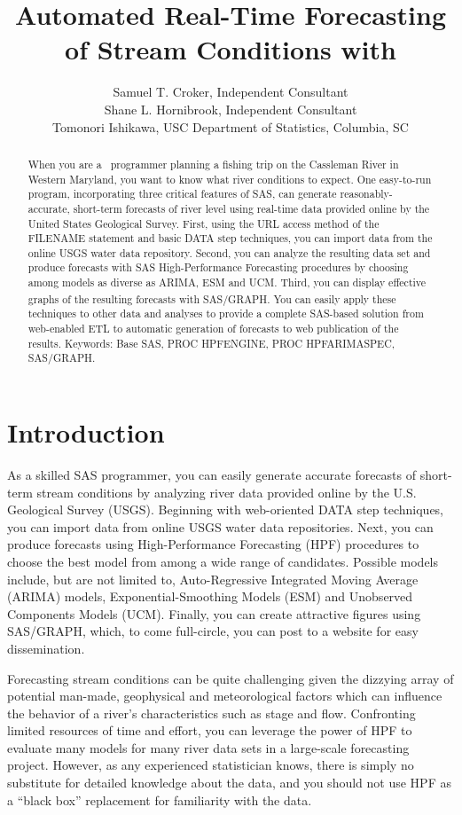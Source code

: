 \documentclass[10pt]{sugconf-ish}
\title{Automated Real-Time Forecasting of Stream Conditions with \SASregistered}
\author{Samuel T. Croker,  Independent Consultant\\
Shane L. Hornibrook,  Independent Consultant \\
Tomonori Ishikawa, USC Department of Statistics, Columbia, SC}
\begin{document}
\begin{abstract}
When you are a \SASregistered\ programmer planning a fishing trip on the Cassleman River in Western Maryland, you want to know what river conditions to expect. One easy-to-run program, incorporating three critical features of SAS, can generate reasonably-accurate, short-term forecasts of river level using real-time data provided online by the United States Geological Survey. First, using the URL access method of the FILENAME statement and basic DATA step techniques, you can import data from the online USGS water data repository. Second, you can analyze the resulting data set and produce forecasts with SAS High-Performance Forecasting procedures by choosing among models as diverse as ARIMA, ESM and UCM. Third, you can display effective graphs of the resulting forecasts with SAS/GRAPH\textsuperscript{\scriptsize\textregistered}. You can easily apply these techniques to other data and analyses to provide a complete SAS-based solution from web-enabled ETL to automatic generation of forecasts to web publication of the results. Keywords: Base SAS, PROC HPFENGINE, PROC HPFARIMASPEC, SAS/GRAPH.
\end{abstract}


\section{Introduction}

As a skilled SAS programmer, you can easily generate accurate forecasts of short-term stream conditions by analyzing river data provided online by the U.S. Geological Survey (USGS). Beginning with web-oriented DATA step techniques, you can import data from online USGS water data repositories. Next, you can produce forecasts using High-Performance Forecasting (HPF) procedures to choose the best model from among a wide range of candidates. Possible models include, but are not limited to, Auto-Regressive Integrated Moving Average (ARIMA) models, Exponential-Smoothing Models (ESM) and Unobserved Components Models (UCM). Finally, you can create attractive figures using SAS/GRAPH, which, to come full-circle, you can post to a website for easy dissemination.

Forecasting stream conditions can be quite challenging given the dizzying array of potential man-made, geophysical and meteorological factors which can influence the behavior of a river's characteristics such as stage and flow. Confronting limited resources of time and effort, you can leverage the power of HPF to evaluate many models for many river data sets in a large-scale forecasting project. However, as any experienced statistician knows, there is simply no substitute for detailed knowledge about the data, and you should not use HPF as a ``black box'' replacement for familiarity with the data.
\end{document}
